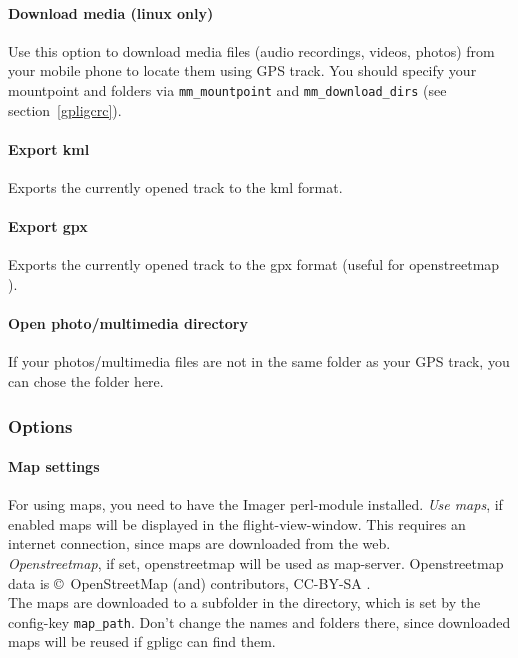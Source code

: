\paragraph{Download media (linux only)}
Use this option to download media files (audio recordings, videos, photos) from your mobile phone to locate them using GPS track.
You should specify your mountpoint and folders via \texttt{mm\_mountpoint} and \texttt{mm\_download\_dirs} (see section~\ref{gpligcrc}).

\paragraph{Export kml}
Exports the currently opened track to the kml format.

\paragraph{Export gpx}
Exports the currently opened track to the gpx format (useful for openstreetmap \cite{osm}).

\paragraph{Open photo/multimedia directory}
If your photos/multimedia files are not in the same folder as your GPS track, you can chose the folder here.



\subsubsection{Options}

\paragraph{Map settings}
For using maps, you need to have the Imager perl-module installed.
\emph{Use maps}, if enabled maps will be displayed in the flight-view-window. 
This requires an internet connection, since maps are downloaded from the web.\\
\emph{Openstreetmap}, if set, openstreetmap will be used as map-server.
Openstreetmap data is \copyright\ OpenStreetMap (and) contributors, CC-BY-SA \cite{osm}.\\

The maps are downloaded to a subfolder in the directory, which is set by the config-key \texttt{map\_path}.
Don't change the names and folders there, since downloaded maps will be reused if gpligc can find them.


